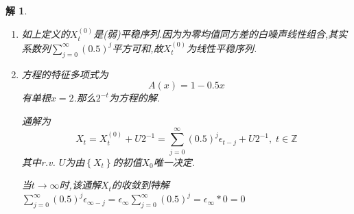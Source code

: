 \documentclass[11pt,a4paper]{ctexart}
\newtheorem*{solution}{解}
\begin{document}
\begin{enumerate}
\begin{solution}
\begin{enumerate}
	方程的特征多项式为
\begin{equation}
		A(x)=1-0.5x
\end{equation}
则
\begin{equation}
\begin{aligned}
	A(\mathcal{B})(X_t- X_t^{(0)})&=(1-0.5\mathcal{B})(X_t- X_t^{(0)})\\
	&=(1-0.5\mathcal{B})(0.5X_{t-1}+\epsilon_t-\sum_{j=0}^{\infty }(0.5)^j \epsilon_{t-j} )\\
	&=0.5X_{t-1}+\epsilon_t-\sum_{j=0}^{\infty }(0.5)^j \epsilon_{t-j}-0.25X_{t-2}-0.5\epsilon_{t-1}+0.5\sum_{j=0}^{\infty }(0.5)^j \epsilon_{t-j-1}\\
	&=0.5X_{t-1}-0.25X_{t-2}-\sum_{j=1}^{\infty }(0.5)^j \epsilon_{t-j}+0.5\sum_{j=1}^{\infty }(0.5)^j \epsilon_{t-j-1}\\
	&=0.5X_{t-1}-0.25X_{t-2}-0.5\epsilon_{t-1}\\
	&=0.5\epsilon_{t-1}-0.5\epsilon_{t-1}\\
	&=0\\
\end{aligned}
\end{equation}
其中$ t\in\mathbb{Z} $

	\item[2)]如上定义的$  X_t^{(0)} $是(弱)平稳序列.因为为零均值同方差的白噪声线性组合,其实系数列$ \sum_{j=0}^{\infty }(0.5)^j $平方可和,故$  X_t^{(0)} $为线性平稳序列.
	
	\item[3)]方程的特征多项式为
	\begin{equation}
		A(x)=1-0.5x
	\end{equation}
有单根$ x=2 $.那么$ 2^{-t} $为方程的解.

通解为
\begin{equation}
	X_t=X_t^{(0)}+U2^{-1}=\sum_{j=0}^{\infty }(0.5)^j \epsilon_{t-j}+U2^{-1},\;t\in\mathbb{Z}
\end{equation}
其中r.v. $ U$为由$ \left\lbrace X_t\right\rbrace  $的初值$X_0 $唯一决定.

当$ t\rightarrow\infty $时,该通解$ X_t $的收敛到特解$\sum_{j=0}^{\infty }(0.5)^j \epsilon_{\infty-j}=\epsilon_{\infty}\sum_{j=0}^{\infty }(0.5)^j = \epsilon_{\infty}*0=0$
\end{enumerate}
\end{solution}
\end{enumerate}
\end{document}
